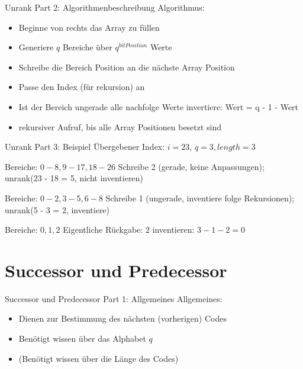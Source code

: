 \documentclass[aspectratio=169]{beamer}
\begin{document}
    \begin{frame}{Unrank \newline Part 2: Algorithmenbeschreibung}
    Algorithmus:
	\begin{itemize}
	    \item Beginne von rechts das Array zu füllen
	    \item Generiere $q$ Bereiche über $q^{bitPosition}$ Werte
	    \item Schreibe die Bereich Position an die nächste Array Position
	    \item Passe den Index (für rekursion) an
	    \item Ist der Bereich ungerade  alle nachfolge Werte \newline invertiere: Wert = q - 1 - Wert 
	    \item rekursiver Aufruf, bis alle Array Positionen besetzt sind
    \end{itemize}
    \end{frame}

	\begin{frame}{Unrank \newline Part 3: Beispiel}
	Übergebener Index: $i = 23$, $q=3, length=3$ \newline
	
	Bereiche: $0-8, 9-17, 18-26$ \newline
	Schreibe 2 (gerade, keine Anpassungen); unrank(23 - 18 = 5, nicht inventieren) \newline
	
	Bereiche: $0-2, 3-5, 6-8$ \newline
	Schreibe 1 (ungerade, inventiere folge Rekursionen); unrank(5 - 3 = 2, inventiere) \newline
	
	Bereiche: $0, 1, 2$ \newline
	Eigentliche Rückgabe: $2$  \newline
	inventieren: $3 - 1 - 2 = 0$
	\end{frame}    
    
    
\section{Successor und Predecessor}
    \begin{frame}{Successor und Predecessor \newline Part 1: Allgemeines}
    Allgemeines:
    \begin{itemize}
	    \item Dienen zur Bestimmung des nächsten (vorherigen) Codes
	    \item Benötigt wissen über das Alphabet $q$
	    \item (Benötigt wissen über die Länge des Codes)
    \end{itemize}
    \end{frame}
    
\end{document}
